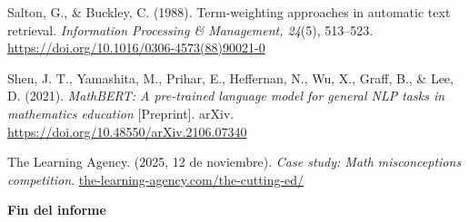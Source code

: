 \documentclass[11pt,oneside,openany]{book}
\begin{document}
\begin{list}{}{%
  \setlength{\leftmargin}{1.27cm}
  \setlength{\itemindent}{-1.27cm}
  \setlength{\itemsep}{0.85em}
  \setlength{\parsep}{0pt}}
\item Salton, G., \& Buckley, C. (1988). Term-weighting approaches in automatic
text retrieval. \emph{Information Processing \& Management, 24}(5), 513--523.
\url{https://doi.org/10.1016/0306-4573(88)90021-0}

\item Shen, J. T., Yamashita, M., Prihar, E., Heffernan, N., Wu, X., Graff, B.,
\& Lee, D. (2021). \emph{MathBERT: A pre-trained language model for general NLP
tasks in mathematics education} [Preprint]. arXiv.
\url{https://doi.org/10.48550/arXiv.2106.07340}

\item The Learning Agency. (2025, 12 de noviembre). \emph{Case study: Math
misconceptions competition}.
\href{https://the-learning-agency.com/the-cutting-ed/article/case-study-math-misconceptions-competition/}{the-learning-agency.com/the-cutting-ed/}

\end{list}

\vfill
\begin{center}
\colorbox{AzulProfundo}{%
  \begin{minipage}{0.72\textwidth}
  \centering\vspace{2.5mm}\color{white}\sffamily
  \textbf{Fin del informe}\vspace{2.5mm}
  \end{minipage}}
\end{center}
\end{document}
